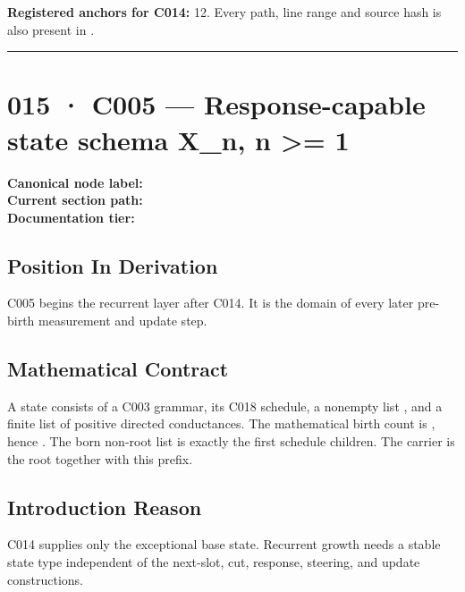 \textbf{Registered anchors for C014:} 12. Every path, line range and
source hash is also present in
\texttt{\protect{}}.

\begin{center}\rule{0.5\linewidth}{0.5pt}\end{center}

\section{015 · C005 --- Response-capable state schema X\_n, n
\textgreater= 1}\label{c005-response-capable-state-schema-x_n-n-1}

\textbf{Canonical node label:} \texttt{\protect{}}\\
\textbf{Current section path:} \texttt{\protect{}}\\
\textbf{Documentation tier:} \texttt{\protect{}}

\subsection{Position In Derivation}\label{position-in-derivation-11}

C005 begins the recurrent layer after C014. It is the domain of every
later pre-birth measurement and update step.

\subsection{Mathematical Contract}\label{mathematical-contract-5}

A state \texttt{\protect{}} consists of a C003 grammar, its C018 schedule, a
nonempty list \texttt{\protect{}}, and a finite list of positive
directed conductances. The mathematical birth count is
\texttt{\protect{}}, hence \texttt{\protect{}}.
The born non-root list is exactly the first \texttt{\protect{}} schedule
children. The carrier is the root together with this prefix.

\subsection{Introduction Reason}\label{introduction-reason-14}

C014 supplies only the exceptional base state. Recurrent growth needs a
stable state type independent of the next-slot, cut, response, steering,
and update constructions.

